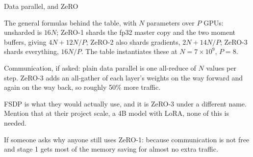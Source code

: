 \documentclass[aspectratio=169,10pt]{beamer}
\begin{document}
\begin{frame}[shrink=12]{Data parallel, and ZeRO}
{  The general formulas behind the table, with $N$ parameters over $P$ GPUs:
  unsharded is $16N$; ZeRO-1 shards the fp32 master copy and the two moment
  buffers, giving $4N + 12N/P$; ZeRO-2 also shards gradients, $2N + 14N/P$;
  ZeRO-3 shards everything, $16N/P$. The table instantiates these at
  $N = 7\times10^9$, $P = 8$.

  Communication, if asked: plain data parallel is one all-reduce of $N$ values
  per step. ZeRO-3 adds an all-gather of each layer's weights on the way forward
  and again on the way back, so roughly 50\% more traffic.

  FSDP is what they would actually use, and it is ZeRO-3 under a different
  name. Mention that at their project scale, a 4B model with LoRA, none of this
  is needed.

  If someone asks why anyone still uses ZeRO-1: because communication is not
  free and stage 1 gets most of the memory saving for almost no extra traffic.}
\end{frame}
\end{document}
